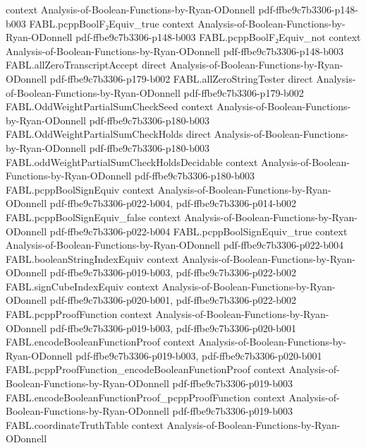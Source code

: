 \begin{theorem}
  {context}
  {Analysis-of-Boolean-Functions-by-Ryan-ODonnell}
  {pdf-ffbe9c7b3306-p148-b003}
\proofstep
  {FABL.pcppBoolF₂Equiv_true}
  {context}
  {Analysis-of-Boolean-Functions-by-Ryan-ODonnell}
  {pdf-ffbe9c7b3306-p148-b003}
\proofstep
  {FABL.pcppBoolF₂Equiv_not}
  {context}
  {Analysis-of-Boolean-Functions-by-Ryan-ODonnell}
  {pdf-ffbe9c7b3306-p148-b003}
\proofstep
  {FABL.allZeroTranscriptAccept}
  {direct}
  {Analysis-of-Boolean-Functions-by-Ryan-ODonnell}
  {pdf-ffbe9c7b3306-p179-b002}
\proofstep
  {FABL.allZeroStringTester}
  {direct}
  {Analysis-of-Boolean-Functions-by-Ryan-ODonnell}
  {pdf-ffbe9c7b3306-p179-b002}
\proofstep
  {FABL.OddWeightPartialSumCheckSeed}
  {context}
  {Analysis-of-Boolean-Functions-by-Ryan-ODonnell}
  {pdf-ffbe9c7b3306-p180-b003}
\proofstep
  {FABL.OddWeightPartialSumCheckHolds}
  {direct}
  {Analysis-of-Boolean-Functions-by-Ryan-ODonnell}
  {pdf-ffbe9c7b3306-p180-b003}
\proofstep
  {FABL.oddWeightPartialSumCheckHoldsDecidable}
  {context}
  {Analysis-of-Boolean-Functions-by-Ryan-ODonnell}
  {pdf-ffbe9c7b3306-p180-b003}
\proofstep
  {FABL.pcppBoolSignEquiv}
  {context}
  {Analysis-of-Boolean-Functions-by-Ryan-ODonnell}
  {pdf-ffbe9c7b3306-p022-b004,
    pdf-ffbe9c7b3306-p014-b002}
\proofstep
  {FABL.pcppBoolSignEquiv_false}
  {context}
  {Analysis-of-Boolean-Functions-by-Ryan-ODonnell}
  {pdf-ffbe9c7b3306-p022-b004}
\proofstep
  {FABL.pcppBoolSignEquiv_true}
  {context}
  {Analysis-of-Boolean-Functions-by-Ryan-ODonnell}
  {pdf-ffbe9c7b3306-p022-b004}
\proofstep
  {FABL.booleanStringIndexEquiv}
  {context}
  {Analysis-of-Boolean-Functions-by-Ryan-ODonnell}
  {pdf-ffbe9c7b3306-p019-b003,
    pdf-ffbe9c7b3306-p022-b002}
\proofstep
  {FABL.signCubeIndexEquiv}
  {context}
  {Analysis-of-Boolean-Functions-by-Ryan-ODonnell}
  {pdf-ffbe9c7b3306-p020-b001,
    pdf-ffbe9c7b3306-p022-b002}
\proofstep
  {FABL.pcppProofFunction}
  {context}
  {Analysis-of-Boolean-Functions-by-Ryan-ODonnell}
  {pdf-ffbe9c7b3306-p019-b003,
    pdf-ffbe9c7b3306-p020-b001}
\proofstep
  {FABL.encodeBooleanFunctionProof}
  {context}
  {Analysis-of-Boolean-Functions-by-Ryan-ODonnell}
  {pdf-ffbe9c7b3306-p019-b003,
    pdf-ffbe9c7b3306-p020-b001}
\proofstep
  {FABL.pcppProofFunction_encodeBooleanFunctionProof}
  {context}
  {Analysis-of-Boolean-Functions-by-Ryan-ODonnell}
  {pdf-ffbe9c7b3306-p019-b003}
\proofstep
  {FABL.encodeBooleanFunctionProof_pcppProofFunction}
  {context}
  {Analysis-of-Boolean-Functions-by-Ryan-ODonnell}
  {pdf-ffbe9c7b3306-p019-b003}
\proofstep
  {FABL.coordinateTruthTable}
  {context}
  {Analysis-of-Boolean-Functions-by-Ryan-ODonnell}

\end{theorem}
